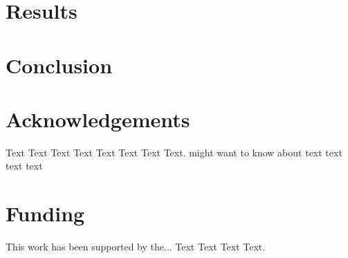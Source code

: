\documentclass{bioinfo}
\begin{document}
\section{Results}


\section{Conclusion}


\section*{Acknowledgements}

Text Text Text Text Text Text  Text Text.  \citealp{Liu2016} might want to know about  text
text text text

\section*{Funding}

This work has been supported by the... Text Text  Text Text.










\end{document}
